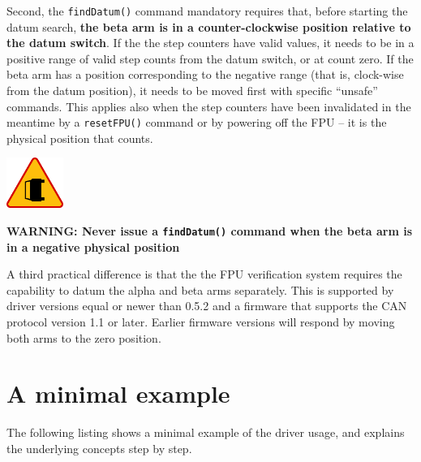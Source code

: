 \documentclass[11pt,a4paper]{report}
\newenvironment{warning}{\begin{framed}\includegraphics[width=5em]{accident-area-ahead.png}
}{\end{framed}}
\begin{document}
 Second, the \texttt{findDatum()}
command mandatory requires that, before starting the datum search,
\textbf{the beta arm is in a counter-clockwise position relative to
  the datum switch}. If the the step counters have valid values, it
needs to be in a positive range of valid step counts from the datum
switch, or at count zero. If the beta arm has a position corresponding
to the negative range (that is, clock-wise from the datum position),
it needs to be moved first with specific ``unsafe'' commands.  This
applies also when the step counters have been invalidated in the
meantime by a \texttt{resetFPU()} command or by powering off the FPU
-- it is the physical position that counts.

\begin{warning}
  \textbf{WARNING: Never issue a \texttt{findDatum()} command when the
    beta arm is in a negative physical position}
\end{warning}


A third practical difference is that the the FPU verification system
requires the capability to datum the alpha and beta arms separately.
This is supported by driver versions equal or newer than 0.5.2 and a
firmware that supports the CAN protocol version 1.1 or later. Earlier
firmware versions will respond by moving both arms to the zero
position.


\section{A minimal example}
\label{sec:minimalexample}
The following listing shows a minimal example of the
driver usage, and explains the underlying concepts
step by step.
\end{document}
